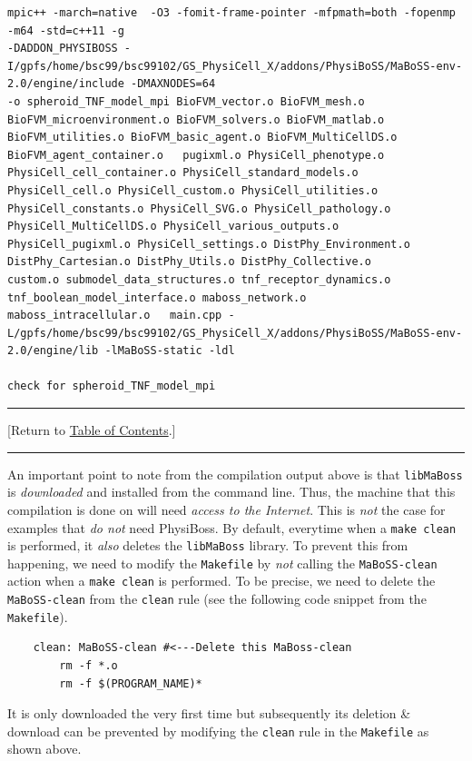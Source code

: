 \documentclass[12pt]{article}
\newcommand{\TOClink}{\begin{center}\hrule\vskip-5pt\phantom{.}\hfill[Return to \hyperlink{TOC}{Table of Contents}.]\hfill\phantom{.}\vskip3pt\hrule\end{center}}
\begin{document}
\begin{tiny}
\begin{verbatim}
mpic++ -march=native  -O3 -fomit-frame-pointer -mfpmath=both -fopenmp -m64 -std=c++11 -g  
-DADDON_PHYSIBOSS -I/gpfs/home/bsc99/bsc99102/GS_PhysiCell_X/addons/PhysiBoSS/MaBoSS-env-2.0/engine/include -DMAXNODES=64  
-o spheroid_TNF_model_mpi BioFVM_vector.o BioFVM_mesh.o BioFVM_microenvironment.o BioFVM_solvers.o BioFVM_matlab.o 
BioFVM_utilities.o BioFVM_basic_agent.o BioFVM_MultiCellDS.o BioFVM_agent_container.o   pugixml.o PhysiCell_phenotype.o 
PhysiCell_cell_container.o PhysiCell_standard_models.o PhysiCell_cell.o PhysiCell_custom.o PhysiCell_utilities.o 
PhysiCell_constants.o PhysiCell_SVG.o PhysiCell_pathology.o PhysiCell_MultiCellDS.o PhysiCell_various_outputs.o 
PhysiCell_pugixml.o PhysiCell_settings.o DistPhy_Environment.o DistPhy_Cartesian.o DistPhy_Utils.o DistPhy_Collective.o 
custom.o submodel_data_structures.o tnf_receptor_dynamics.o tnf_boolean_model_interface.o maboss_network.o 
maboss_intracellular.o   main.cpp -L/gpfs/home/bsc99/bsc99102/GS_PhysiCell_X/addons/PhysiBoSS/MaBoSS-env-2.0/engine/lib -lMaBoSS-static -ldl

check for spheroid_TNF_model_mpi
\end{verbatim}
\end{tiny}

\TOClink

An important point to note from the compilation output above is that \texttt{libMaBoss} is \textit{downloaded} and installed from the command line. Thus, the machine that this compilation is done on will need \textit{access to the Internet}. This is \textit{not} the case for examples that \textit{do not} need PhysiBoss. By default, everytime when a \texttt{make clean} is performed, it \textit{also} deletes the \texttt{libMaBoss} library. To prevent this from happening, we need to modify the \texttt{Makefile} by \textit{not} calling the \texttt{MaBoSS-clean} action when a \texttt{make clean} is performed. To be precise, we need to delete the \texttt{MaBoSS-clean} from the \texttt{clean} rule (see the following code snippet from the \texttt{Makefile}).



\begin{verbatim}
    clean: MaBoSS-clean #<---Delete this MaBoss-clean
	    rm -f *.o
	    rm -f $(PROGRAM_NAME)*
\end{verbatim}

\begin{tcolorbox}[enhanced,attach boxed title to top center={yshift=-3mm,yshifttext=-1mm},
  colback=blue!5!white,colframe=blue!75!black,colbacktitle=red!80!black,
  title=libMaBoss library,fonttitle=\bfseries,
  boxed title style={size=small,colframe=red!50!black} ]
  It is only downloaded the very first time but subsequently its deletion \& download can be prevented by modifying the \texttt{clean} rule in the \texttt{Makefile} as shown above. 
\end{tcolorbox}
\end{document}
